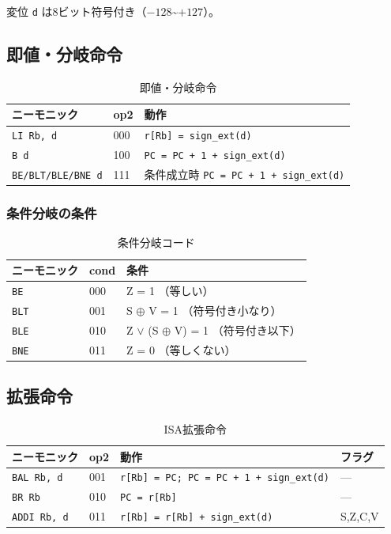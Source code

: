 \documentclass[a4paper,11pt]{ltjsarticle}
\begin{document}
変位 \texttt{d} は8ビット符号付き（$-128$\textasciitilde$+127$）。

\subsection{即値・分岐命令}

\begin{table}[h]
\centering
\caption{即値・分岐命令}
\begin{tabular}{llp{7cm}}
\toprule
ニーモニック & op2 & 動作 \\
\midrule
\texttt{LI Rb, d}     & 000 & \texttt{r[Rb] = sign\_ext(d)} \\
\texttt{B d}           & 100 & \texttt{PC = PC + 1 + sign\_ext(d)} \\
\texttt{BE/BLT/BLE/BNE d} & 111 & 条件成立時 \texttt{PC = PC + 1 + sign\_ext(d)} \\
\bottomrule
\end{tabular}
\end{table}

\subsubsection{条件分岐の条件}

\begin{table}[h]
\centering
\caption{条件分岐コード}
\begin{tabular}{lll}
\toprule
ニーモニック & cond & 条件 \\
\midrule
\texttt{BE}  & 000 & Z = 1 （等しい） \\
\texttt{BLT} & 001 & S $\oplus$ V = 1 （符号付き小なり） \\
\texttt{BLE} & 010 & Z $\vee$ (S $\oplus$ V) = 1 （符号付き以下） \\
\texttt{BNE} & 011 & Z = 0 （等しくない） \\
\bottomrule
\end{tabular}
\end{table}

\subsection{拡張命令}

\begin{table}[h]
\centering
\caption{ISA拡張命令}
\begin{tabular}{llp{7cm}l}
\toprule
ニーモニック & op2 & 動作 & フラグ \\
\midrule
\texttt{BAL Rb, d} & 001 & \texttt{r[Rb] = PC; PC = PC + 1 + sign\_ext(d)} & --- \\
\texttt{BR Rb}     & 010 & \texttt{PC = r[Rb]} & --- \\
\texttt{ADDI Rb, d}& 011 & \texttt{r[Rb] = r[Rb] + sign\_ext(d)} & S,Z,C,V \\
\bottomrule
\end{tabular}
\end{table}
\end{document}
